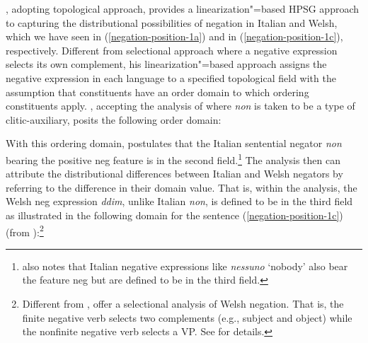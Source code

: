 \documentclass[output=paper
                ,modfonts
                ,nonflat
	        ,collection
	        ,collectionchapter
	        ,collectiontoclongg
 	        ,biblatex
                ,babelshorthands
                ,newtxmath
                ,draftmode
                ,colorlinks, citecolor=brown
]{./langsci/langscibook}
\begin{document}
{\begin{exe}
\begin{xlist}

\citet{Borsley:06}, adopting  topological approach,
 provides a linearization"=based HPSG approach to capturing the distributional possibilities of negation in Italian and Welsh, which we have seen
 in (\ref{negation-position-1a}) and in (\ref{negation-position-1c}), respectively.
%
%
  Different from  selectional
  approach where a negative expression selects its own complement,
  his linearization"=based approach assigns the negative expression in
each language to a specified topological field with the assumption that 
constituents have an order domain to which ordering constituents
apply. \citet{Borsley:06}, accepting the analysis of \citet{Kim:00}
where \textit{non} is taken to be a type of clitic-auxiliary, posits the following
order domain:


\ea
{}
\z
%
With this ordering domain, \citet{Borsley:06} postulates
that the Italian sentential negator {\it non} bearing the positive {\sc neg} feature is in the second field.\footnote{
\citet{Borsley:06} also notes that Italian negative expressions like {\it nessuno} `nobody' also bear the feature {\sc neg}
but are defined to be in the third field.} 
The analysis then can attribute the distributional differences between Italian and Welsh negators 
by referring to the difference in their domain value. That is,
within the analysis, the Welsh {\sc neg} expression {\it ddim}, unlike Italian {\it non},
is defined to be in the third field as illustrated in the following domain for the sentence (\ref{negation-position-1c}) (from
\citealt{Borsley:06}):\footnote{Different from \citet{Borsley:06}, \citet{BJ:00} offer  a selectional analysis of Welsh negation.
That is, the finite negative verb selects
two complements (e.g., subject and object) while
the nonfinite negative verb selects a VP. See \citet{BJ:00} for details.}


\end{xlist}
\end{exe}}
\end{document}
